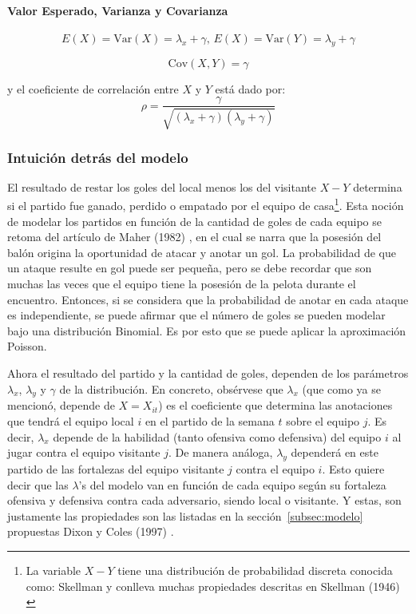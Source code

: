 \paragraph{Valor Esperado, Varianza y Covarianza} %
\label{par:valor_esperado}
 \[E(X) = \mathrm{Var}(X) = \lambda_x + \gamma \text{, } E(X) = \mathrm{Var}(Y) = \lambda_y + \gamma\]
 
 \[\mathrm{Cov}(X,Y) = \gamma\]


 y el coeficiente de correlación entre $X$ y $Y$ está dado por:
 \[\rho = \frac{\gamma}{\sqrt{(\lambda_x+\gamma)(\lambda_y+\gamma)}}\]
 




\subsubsection{Intuición detrás del modelo}
\label{subsubsec:intuicion}
 El resultado de restar los goles del local menos los del visitante $X-Y$ determina si el partido fue ganado, perdido o empatado por el equipo de casa\footnote{La variable $X-Y$ tiene una distribución de probabilidad discreta conocida como: Skellman y conlleva muchas propiedades descritas en Skellman (1946) \cite{skellam1946frequency}}. Esta noción de modelar los partidos en función de la cantidad de goles de cada equipo se retoma del artículo de Maher (1982) \cite{maher1982modelling}, en el cual se narra que la posesión del balón origina la oportunidad de atacar y anotar un gol. La probabilidad de que un ataque resulte en gol puede ser pequeña, pero se debe recordar que son muchas las veces que el equipo tiene la posesión de la pelota durante el encuentro. Entonces, si se considera que la probabilidad de anotar en cada ataque es independiente, se puede afirmar que el número de goles se pueden modelar bajo una distribución Binomial. Es por esto que se puede aplicar la aproximación Poisson.
 
 Ahora el resultado del partido y la cantidad de goles, dependen de los parámetros $\lambda_x$, $\lambda_y$ y $\gamma$ de la distribución. En concreto, obsérvese que $\lambda_x$ (que como ya se mencionó, depende de $X = X_{it}$) es el coeficiente que determina las anotaciones que tendrá el equipo local $i$ en el partido de la semana $t$ sobre el equipo $j$. Es decir, $\lambda_x$ depende de la habilidad (tanto ofensiva como defensiva) del equipo $i$ al jugar contra el equipo visitante $j$. De manera análoga, $\lambda_y$ dependerá en este partido de las fortalezas del equipo visitante $j$ contra el equipo $i$.
 Esto quiere decir que las $\lambda$'s del modelo van en función de cada equipo según su fortaleza ofensiva y defensiva contra cada adversario, siendo local o visitante. Y estas, son justamente las propiedades son las listadas en la sección~\ref{subsec:modelo} propuestas Dixon y Coles (1997) \cite{dixon1997modelling}.
 
